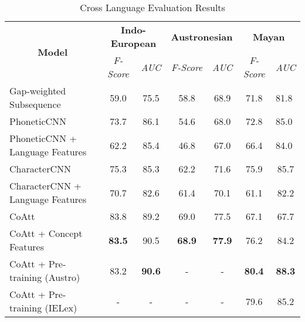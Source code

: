 \begin{table*}[t]
\centering
\begin{tabular}{lcccccc}
\multicolumn{1}{c}{\multirow{2}{*}{\textbf{Model}}} & \multicolumn{2}{c}{\textbf{Indo-European}} & \multicolumn{2}{c}{\textbf{Austronesian}} & \multicolumn{2}{c}{\textbf{Mayan}}                  \\ \cline{2-7} 
\multicolumn{1}{c}{}                                & \textit{F-Score}      & \textit{AUC}       & \textit{F-Score}      & \textit{AUC}      & \textit{F-Score} & \multicolumn{1}{l}{\textit{AUC}} \\ \hline
Gap-weighted Subsequence                            & 59.0                  & 75.5               & 58.8                  & 68.9              & 71.8             & \multicolumn{1}{l}{81.8}         \\ \hline
PhoneticCNN                                         & 73.7                  & 86.1               & 54.6                  & 68.0              & 72.8             & \multicolumn{1}{l}{85.0}         \\
PhoneticCNN + Language Features                     & 62.2                  & 85.4               & 46.8                  & 67.0              & 66.4             & \multicolumn{1}{l}{84.0}         \\
CharacterCNN                                        & 75.3                  & 85.3               & 62.2                  & 71.6              & 75.9             & 85.7                             \\
CharacterCNN + Language Features                    & 70.7                  & 82.6               & 61.4                  & 70.1              & 61.1             & 82.2                             \\ \hline
CoAtt                                               & 83.8                  & 89.2               & 69.0                  & 77.5              & 67.1             & 67.7                             \\
CoAtt + Concept Features                            & \textbf{83.5}         & 90.5               & \textbf{68.9}         & \textbf{77.9}     & 76.2             & 84.2                             \\
CoAtt + Pre-training (Austro)                       & 83.2                  & \textbf{90.6}      & -                     & -                 & \textbf{80.4}    & \textbf{88.3}                    \\
CoAtt + Pre-training (IELex)                        & -                     & -                  & -                     & -                 & 79.6             & 85.2                            
\end{tabular}
\label{CL_res}
\caption{Cross Language Evaluation Results}
\end{table*}

